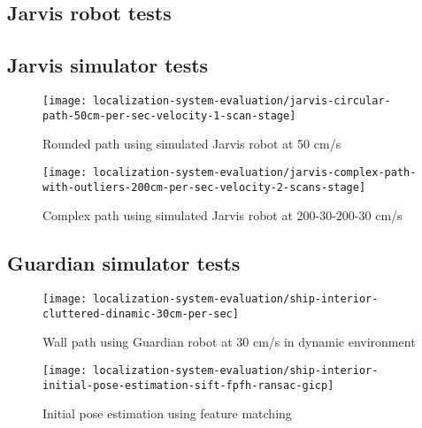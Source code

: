 \clearpage
\subsection{Jarvis robot tests}


\clearpage

\clearpage

\subsection{Jarvis simulator tests}

\begin{figure}[H]
	\centering
	\texttt{[image: localization-system-evaluation/jarvis-circular-path-50cm-per-sec-velocity-1-scan-stage]}
	\caption{Rounded path using simulated Jarvis robot at 50 cm/s}
	\label{fig:localization-system-evaluation_jarvis-circular-path-50cm-per-sec-velocity-1-scan-stage}
\end{figure}

\begin{figure}[H]
	\centering
	\texttt{[image: localization-system-evaluation/jarvis-complex-path-with-outliers-200cm-per-sec-velocity-2-scans-stage]}
	\caption{Complex path using simulated Jarvis robot at 200-30-200-30 cm/s}
	\label{fig:localization-system-evaluation_jarvis-complex-path-with-outliers-200cm-per-sec-velocity-2-scans-stage}
\end{figure}


\subsection{Guardian simulator tests}

\begin{figure}[H]
	\centering
	\texttt{[image: localization-system-evaluation/ship-interior-cluttered-dinamic-30cm-per-sec]}
	\caption{Wall path using Guardian robot at 30 cm/s in dynamic environment}
	\label{fig:localization-system-evaluation_ship-interior-cluttered-dinamic-30cm-per-sec}
\end{figure}

\begin{figure}[H]
	\centering
	\texttt{[image: localization-system-evaluation/ship-interior-initial-pose-estimation-sift-fpfh-ransac-gicp]}
	\caption{Initial pose estimation using feature matching}
	\label{fig:localization-system-evaluation_ship-interior-initial-pose-estimation-sift-fpfh-ransac-gicp}
\end{figure}



